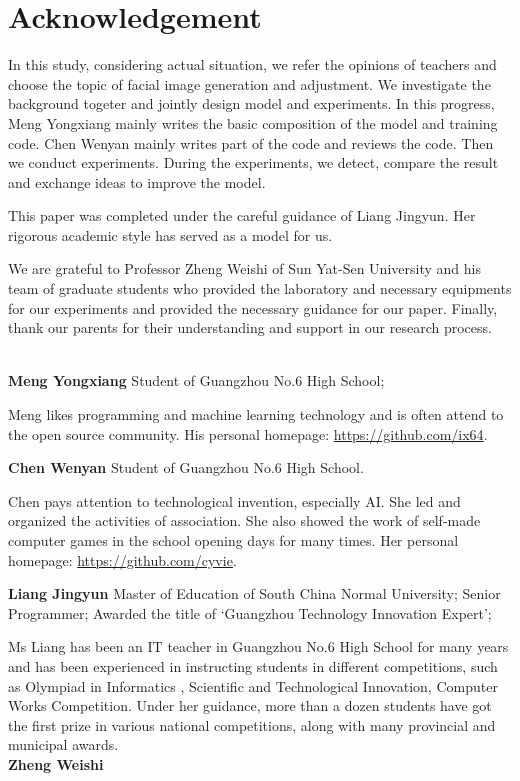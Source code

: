 \section*{Acknowledgement}

In this study, considering actual situation, we refer the opinions of teachers and choose the topic of facial image generation and adjustment. We investigate the background togeter and jointly design model and experiments. In this progress, Meng Yongxiang mainly writes the basic composition of the model and training code. Chen Wenyan mainly writes part of the code and reviews the code. Then we conduct experiments. During the experiments, we detect, compare the result and exchange ideas to improve the model.

This paper was completed under the careful guidance of Liang Jingyun. Her rigorous academic style has served as a model for us.

We are grateful to Professor Zheng Weishi of Sun Yat-Sen University and his team of graduate students who provided the laboratory and necessary equipments for our experiments and provided the necessary guidance for our paper.
Finally, thank our parents for their understanding and support in our research process.

~\\


\textbf{Meng Yongxiang}  Student of Guangzhou No.6 High School;

Meng likes programming and machine learning technology and is often attend to the open source community. His personal homepage: \url{https://github.com/ix64}.


\textbf{Chen Wenyan}  Student of Guangzhou No.6 High School.

Chen pays attention to technological invention, especially AI. She led and organized the activities of association. She also showed the work of self-made computer games in the school opening days for many times. Her personal homepage: \url{https://github.com/cyvie}.


\textbf{Liang Jingyun}  Master of Education of South China Normal University; Senior Programmer; Awarded the title of ‘Guangzhou Technology Innovation Expert’;

Ms Liang has been an IT teacher in  Guangzhou No.6 High School for many years and has been experienced in instructing students in different competitions, such as Olympiad in Informatics , Scientific and Technological Innovation, Computer Works Competition. Under her guidance, more than a dozen students have got the first prize in various national competitions, along with many provincial and municipal awards.\\


\textbf{Zheng Weishi}

